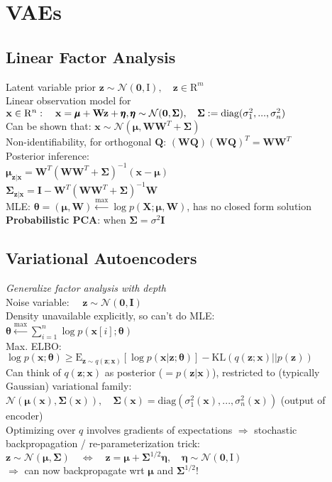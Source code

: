 \section*{VAEs}
\subsection*{Linear Factor Analysis}
Latent variable prior $\mathbf z\sim\mathcal N(\mathbf 0,\mathrm I), \quad \mathbf z\in\mathrm R^m$\\
Linear observation model for $\mathbf x\in\mathrm R^n: \quad\mathbf x=\pmb\mu+\mathbf{Wz}+\pmb\eta, \\ \pmb\eta\sim\mathcal N(\mathbf 0, \pmb\Sigma),\quad \pmb\Sigma:=\text{diag}(\sigma_1^2,...,\sigma_n^2)$\\
Can be shown that: $\mathbf x\sim\mathcal N(\pmb\mu,\mathbf{WW}^T+\pmb\Sigma)$\\
Non-identifiability, for orthogonal $\mathbf Q$: $(\mathbf{WQ})(\mathbf{WQ})^T=\mathbf{WW}^T$\\
Posterior inference:\\ $\pmb\mu_{\mathbf{z|x}}=\mathbf W^T(\mathbf{WW}^T+\pmb\Sigma)^{-1}(\mathbf x-\pmb\mu)$\\
$\pmb\Sigma_{\mathbf{z|x}}=\mathbf I-\mathbf W^T(\mathbf{WW}^T+\pmb\Sigma)^{-1}\mathbf W$\\
MLE: $\pmb\theta=(\pmb\mu,\mathbf W)\overset{\max}{\leftarrow}\log p(\mathbf X;\pmb\mu,\mathbf W)$, has no closed form solution\\
\textbf{Probabilistic PCA}: when $\pmb\Sigma=\sigma^2\mathbf I$
\subsection*{Variational Autoencoders}
\textit{Generalize factor analysis with depth}\\
Noise variable: $\quad \mathbf z\sim\mathcal N(\mathbf 0, \mathbf I)$\\
Density unavailable explicitly, so can't do MLE:\\ $\pmb\theta\overset{\max}{\leftarrow}\sum_{i=1}^n\log p(\mathbf x[i];\pmb\theta)$\\
Max. ELBO: $\log p(\mathbf x;\pmb\theta)\geq \mathrm E_{\mathbf z\sim q(\mathbf z;\mathbf x)}[\log p(\mathbf x|\mathbf z;\pmb\theta)]-\text{KL}(q(\mathbf z;\mathbf x)||p(\mathbf z))$\\
Can think of $q(\mathbf z;\mathbf x)$ as posterior ($=p(\mathbf{z|x})$), restricted to (typically Gaussian) variational family: \\ $\mathcal N(\pmb\mu(\mathbf x),\pmb\Sigma(\mathbf x)), \quad \pmb\Sigma(\mathbf x)=\text{diag}(\sigma_1^2(\mathbf x),...,\sigma_n^2(\mathbf x))$ (output of encoder)\\
Optimizing over $q$ involves gradients of expectations $\Rightarrow$ stochastic backpropagation / re-parameterization trick:\\
$\mathbf z\sim\mathcal N(\pmb\mu,\pmb\Sigma) \quad \Leftrightarrow \quad\mathbf z=\pmb\mu+\pmb\Sigma^{1/2}\pmb\eta, \quad \pmb\eta\sim\mathcal N(\mathbf 0,\mathrm I)$\\
$\Rightarrow$ can now backpropagate wrt $\pmb\mu$ and $\pmb\Sigma^{1/2}$!